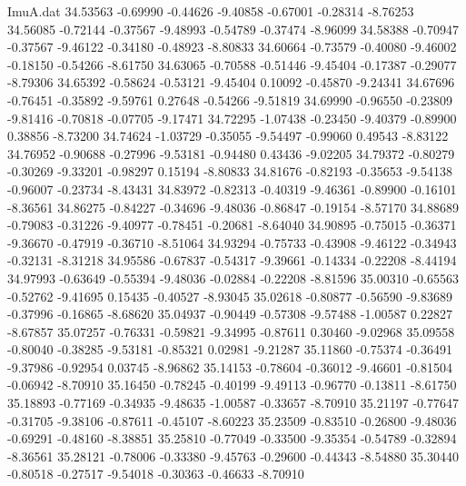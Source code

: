 \begin{filecontents}{ImuA.dat}
  34.53563   -0.69990   -0.44626   -9.40858   -0.67001   -0.28314   -8.76253
  34.56085   -0.72144   -0.37567   -9.48993   -0.54789   -0.37474   -8.96099
  34.58388   -0.70947   -0.37567   -9.46122   -0.34180   -0.48923   -8.80833
  34.60664   -0.73579   -0.40080   -9.46002   -0.18150   -0.54266   -8.61750
  34.63065   -0.70588   -0.51446   -9.45404   -0.17387   -0.29077   -8.79306
  34.65392   -0.58624   -0.53121   -9.45404    0.10092   -0.45870   -9.24341
  34.67696   -0.76451   -0.35892   -9.59761    0.27648   -0.54266   -9.51819
  34.69990   -0.96550   -0.23809   -9.81416   -0.70818   -0.07705   -9.17471
  34.72295   -1.07438   -0.23450   -9.40379   -0.89900    0.38856   -8.73200
  34.74624   -1.03729   -0.35055   -9.54497   -0.99060    0.49543   -8.83122
  34.76952   -0.90688   -0.27996   -9.53181   -0.94480    0.43436   -9.02205
  34.79372   -0.80279   -0.30269   -9.33201   -0.98297    0.15194   -8.80833
  34.81676   -0.82193   -0.35653   -9.54138   -0.96007   -0.23734   -8.43431
  34.83972   -0.82313   -0.40319   -9.46361   -0.89900   -0.16101   -8.36561
  34.86275   -0.84227   -0.34696   -9.48036   -0.86847   -0.19154   -8.57170
  34.88689   -0.79083   -0.31226   -9.40977   -0.78451   -0.20681   -8.64040
  34.90895   -0.75015   -0.36371   -9.36670   -0.47919   -0.36710   -8.51064
  34.93294   -0.75733   -0.43908   -9.46122   -0.34943   -0.32131   -8.31218
  34.95586   -0.67837   -0.54317   -9.39661   -0.14334   -0.22208   -8.44194
  34.97993   -0.63649   -0.55394   -9.48036   -0.02884   -0.22208   -8.81596
  35.00310   -0.65563   -0.52762   -9.41695    0.15435   -0.40527   -8.93045
  35.02618   -0.80877   -0.56590   -9.83689   -0.37996   -0.16865   -8.68620
  35.04937   -0.90449   -0.57308   -9.57488   -1.00587    0.22827   -8.67857
  35.07257   -0.76331   -0.59821   -9.34995   -0.87611    0.30460   -9.02968
  35.09558   -0.80040   -0.38285   -9.53181   -0.85321    0.02981   -9.21287
  35.11860   -0.75374   -0.36491   -9.37986   -0.92954    0.03745   -8.96862
  35.14153   -0.78604   -0.36012   -9.46601   -0.81504   -0.06942   -8.70910
  35.16450   -0.78245   -0.40199   -9.49113   -0.96770   -0.13811   -8.61750
  35.18893   -0.77169   -0.34935   -9.48635   -1.00587   -0.33657   -8.70910
  35.21197   -0.77647   -0.31705   -9.38106   -0.87611   -0.45107   -8.60223
  35.23509   -0.83510   -0.26800   -9.48036   -0.69291   -0.48160   -8.38851
  35.25810   -0.77049   -0.33500   -9.35354   -0.54789   -0.32894   -8.36561
  35.28121   -0.78006   -0.33380   -9.45763   -0.29600   -0.44343   -8.54880
  35.30440   -0.80518   -0.27517   -9.54018   -0.30363   -0.46633   -8.70910

\end{filecontents}
